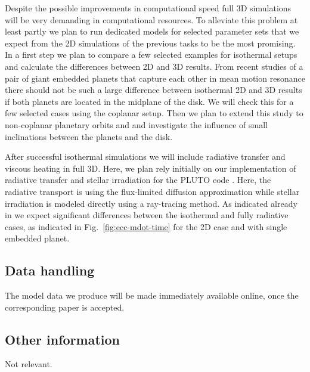 \documentclass[10pt,fleqn,twoside]{article}
\begin{document}
\begin{description}
Despite the possible improvements in computational speed full 3D simulations will be very
demanding in computational resources. To alleviate this problem at least partly we plan to run
dedicated models for selected parameter sets that we expect from the 2D simulations of the previous
tasks to be the most promising. In a first step we plan to compare a few selected examples for
isothermal setups and calculate the differences between 2D and 3D results.
From recent studies of a pair of giant embedded planets that capture each other
in mean motion resonance there should not be such a large difference between isothermal 2D and 3D results
\citep{2016MNRAS.461.4406A} if both planets are located in the midplane of the disk. 
We will check this for a few selected cases using the coplanar setup.
Then we plan to extend this study to non-coplanar planetary orbits and
and investigate the influence of small inclinations between the planets and the disk.

After successful isothermal simulations we will include radiative transfer and viscous heating in full 3D.
Here, we plan rely initially on our implementation of radiative transfer and stellar irradiation for the
PLUTO code \citep{2013A&A...559A..80K}. Here, the radiative transport is using the flux-limited diffusion
approximation while stellar irradiation is modeled directly using a ray-tracing method.
As indicated already in \citet{2013A&A...560A..40M} we expect significant differences between the 
isothermal and fully radiative cases, as indicated in Fig.~\ref{fig:ecc-mdot-time} for the 2D case and
with single embedded planet.

\end{description}


\subsection{Data handling}
The model data we produce will be made immediately available online, once
the corresponding paper is accepted. 

\subsection{Other information}
Not relevant.
\end{document}
